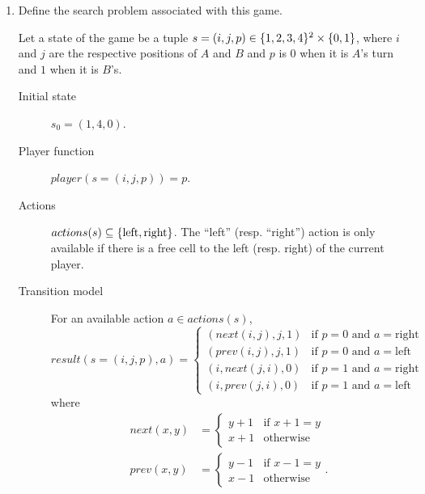 \documentclass[11pt, a4paper]{article}
\begin{document}
\begin{enumerate}
    \item Define the search problem associated with this game.

    \begin{solution}
        Let a state of the game be a tuple $s = (i, j, p) \in \{1, 2, 3, 4\}^2 \times \{0, 1\}$, where $i$ and $j$ are the respective positions of $A$ and $B$ and $p$ is $0$ when it is $A$'s turn and $1$ when it is $B$'s.
        \begin{description}
            \item[Initial state] $s_0 = (1, 4, 0)$.
            \item[Player function] $player(s = (i, j, p)) = p$.
            \item[Actions] $actions(s) \subseteq \{\text{left}, \text{right}\}$. The \enquote{left} (resp. \enquote{right}) action is only available if there is a free cell to the left (resp. right) of the current player.
            \item[Transition model] For an available action $a \in actions(s)$,
            \begin{equation*}
                result(s = (i, j, p), a) = \begin{cases}
                    (next(i, j), j, 1) & \text{if } p = 0 \text{ and } a = \text{right} \\
                    (prev(i, j), j, 1) & \text{if } p = 0 \text{ and } a = \text{left} \\
                    (i, next(j, i), 0) & \text{if } p = 1 \text{ and } a = \text{right} \\
                    (i, prev(j, i), 0) & \text{if } p = 1 \text{ and } a = \text{left}
                \end{cases}
            \end{equation*}
            where
            \begin{align*}
                next(x, y) & = \begin{cases}
                    y + 1 & \text{if } x + 1 = y \\
                    x + 1 & \text{otherwise}
                \end{cases} \\
                prev(x, y) & = \begin{cases}
                    y - 1 & \text{if } x - 1 = y \\
                    x - 1 & \text{otherwise}
                \end{cases} .

\end{align*}
\end{description}
\end{solution}
\end{enumerate}
\end{document}
